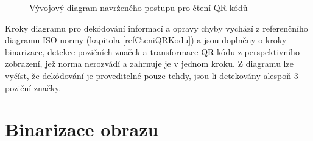 \begin{figure}[H]
  \begin{center}
    \caption{Vývojový diagram navrženého postupu pro čtení QR kódů}
    \label{QRCodeReadingProcess}
  \end{center}
\end{figure}

Kroky diagramu pro dekódování informací a opravy chyby vychází z referenčního
diagramu ISO normy (kapitola \ref{refCteniQRKodu}) a jsou doplněny o kroky
binarizace, detekce pozičních značek a transformace QR kódu z perspektivního zobrazení, jež norma
nerozvádí a zahrnuje je v jednom kroku.
Z diagramu lze vyčíst, že dekódování je proveditelné pouze tehdy, jsou-li
detekovány alespoň 3 poziční značky.

\section{Binarizace obrazu}
\label{binarizaceObrazu}

